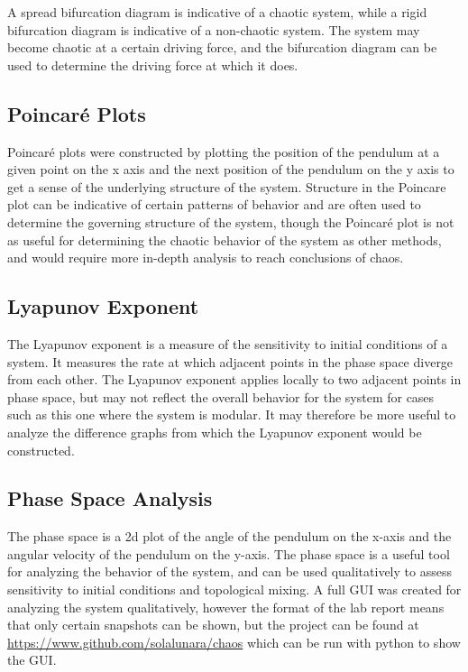 \documentclass[11pt]{article} %
\begin{document}
        A spread bifurcation diagram is indicative of a chaotic system, while a rigid bifurcation diagram is indicative of a non-chaotic
        system. The system may become chaotic at a certain driving force, and the bifurcation diagram can be used to determine the
        driving force at which it does.\\
    \subsection{Poincar\'e Plots}
        Poincar\'e plots were constructed by plotting the position of the pendulum at a given point on the x axis and the next position of
        the pendulum on the y axis to get a sense of the underlying structure of the system. Structure in the Poincare plot can be indicative
        of certain patterns of behavior and are often used to determine the governing structure of the system, though the Poincar\'e plot
        is not as useful for determining the chaotic behavior of the system as other methods, and would require more in-depth analysis to reach
        conclusions of chaos.\\
    \subsection{Lyapunov Exponent}
        The Lyapunov exponent is a measure of the sensitivity to initial conditions of a system. It measures the rate at which
        adjacent points in the phase space diverge from each other. The Lyapunov exponent applies locally to two adjacent points in phase
        space, but may not reflect the overall behavior for the system for cases such as this one where the system is modular. It may therefore
        be more useful to analyze the difference graphs from which the Lyapunov exponent would be constructed.
    \subsection{Phase Space Analysis}
        The phase space is a 2d plot of the angle of the pendulum on the x-axis and the angular velocity of the pendulum on the y-axis. 
        The phase space is a useful tool for analyzing the behavior of the system, and can be used qualitatively to assess sensitivity 
        to initial conditions and topological mixing. A full GUI was created for analyzing the system qualitatively, however the format
        of the lab report means that only certain snapshots can be shown, but the project can be found at 
        \href{https://www.github.com/solalunara/chaos}{https://www.github.com/solalunara/chaos} which can be run with python to show the GUI.\\
\end{document}
